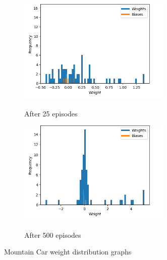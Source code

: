 \begin{figure}[H]
  \captionsetup[subfigure]{justification=centering}
  \centering
  \begin{subfigure}[t]{0.47\linewidth}
    {\includegraphics[height=5cm]{figures/images/mountain_car_weights_25.png}}
    \caption{After 25 episodes}
  \end{subfigure}
  \hfill
  \begin{subfigure}[t]{0.47\linewidth}
    {\includegraphics[height=5cm]{figures/images/mountain_car_weights_500.png}}
    \caption{After 500 episodes}
  \end{subfigure}
  \caption{Mountain Car weight distribution graphs}
  \label{fig:mountain_car_w_viz}
\end{figure}

